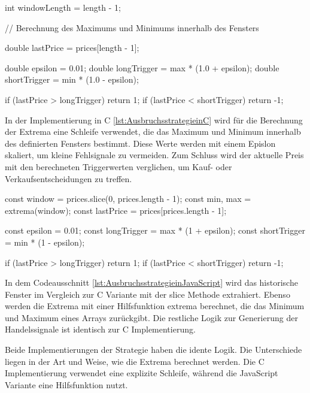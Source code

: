 \begin{CCode}[caption={Ausbruchsstrategie in C}, label={lst:AusbruchsstrategieinC}]
    int windowLength = length - 1;

    // Berechnung des Maximums und Minimums innerhalb des Fensters

    double lastPrice = prices[length - 1];

    double epsilon = 0.01;
    double longTrigger = max * (1.0 + epsilon);
    double shortTrigger = min * (1.0 - epsilon);

    if (lastPrice > longTrigger) {
        return 1;
    }
    if (lastPrice < shortTrigger) {
        return -1;
    }
\end{CCode}

In der Implementierung in C \ref{lst:AusbruchsstrategieinC} wird für die Berechnung der Extrema eine Schleife verwendet, die das Maximum und Minimum innerhalb des definierten Fensters bestimmt.
Diese Werte werden mit einem Epislon skaliert, um kleine Fehlsignale zu vermeiden.
Zum Schluss wird der aktuelle Preis mit den berechneten Triggerwerten verglichen, um Kauf- oder Verkaufsentscheidungen zu treffen.

\begin{JsCode}[caption={Ausbruchsstrategie in JavaScript}, label={lst:AusbruchsstrategieinJavaScript}]
    const window = prices.slice(0, prices.length - 1);
    const { min, max } = extrema(window);
    const lastPrice = prices[prices.length - 1];

    const epsilon = 0.01;
    const longTrigger = max * (1 + epsilon);
    const shortTrigger = min * (1 - epsilon);

    if (lastPrice > longTrigger) {
        return 1;
    }
    if (lastPrice < shortTrigger) {
        return -1;
    }
\end{JsCode}

In dem Codeausschnitt \ref{lst:AusbruchsstrategieinJavaScript} wird das historische Fenster im Vergleich zur C Variante mit der slice Methode extrahiert.
Ebenso werden die Extrema mit einer Hilfsfunktion extrema berechnet, die das Minimum und Maximum eines Arrays zurückgibt.
Die restliche Logik zur Generierung der Handelssignale ist identisch zur C Implementierung.\newline

Beide Implementierungen der Strategie haben die idente Logik.
Die Unterschiede liegen in der Art und Weise, wie die Extrema berechnet werden.
Die C Implementierung verwendet eine explizite Schleife, während die JavaScript Variante eine Hilfsfunktion nutzt.

